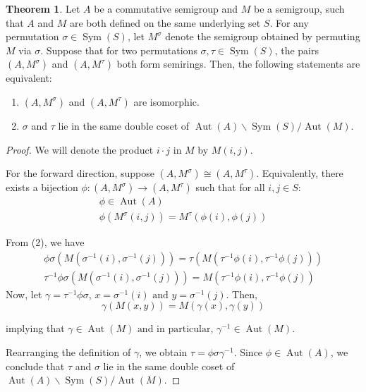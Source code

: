 \documentclass{article}
\theoremstyle{definition}
\newtheorem{theorem}{Theorem}
\begin{document}
\begin{theorem}
    \label{thm:isomorphism-condition}
    Let \(A\) be a commutative semigroup and \(M\) be a semigroup, such that \(A\) and \(M\) are both defined on the same underlying set \(S\). For any permutation \(\sigma \in \operatorname{Sym}(S)\), let \(M^\sigma\) denote the semigroup obtained by permuting \(M\) via \(\sigma\). Suppose that for two permutations \(\sigma, \tau\in\operatorname{Sym}(S)\), the pairs \((A,M^\sigma)\) and \((A,M^\tau)\) both form semirings. Then, the following statements are equivalent:
    \begin{enumerate}
        \item \((A, M^\sigma)\) and \((A, M^\tau)\) are isomorphic.
        \item \(\sigma\) and \(\tau\) lie in the same double coset of \(\operatorname{Aut}(A) \backslash \operatorname{Sym}(S) / \operatorname{Aut}(M)\).
    \end{enumerate}
\begin{proof}
    We will denote the product \(i\cdot j\) in \(M\) by \(M(i,j)\).

    For the forward direction, suppose \((A, M^\sigma) \cong (A, M^\tau)\). Equivalently, there exists a bijection \(\phi: (A, M^\sigma) \to (A, M^\tau)\) such that for all \(i, j \in S\):
    \begin{gather}
         \phi \in \operatorname{Aut}(A)\\
         \phi(M^\sigma(i,j)) = M^\tau(\phi(i),\phi(j))
    \end{gather}

    From (2), we have
    \begin{gather*}
        \phi\sigma(M(\sigma^{-1}(i), \sigma^{-1}(j))) = \tau(M(\tau^{-1}\phi(i), \tau^{-1}\phi(j))) \\
        \tau^{-1}\phi\sigma(M(\sigma^{-1}(i), \sigma^{-1}(j))) = M(\tau^{-1}\phi(i), \tau^{-1}\phi(j))
    \end{gather*}
    Now, let \(\gamma = \tau^{-1}\phi\sigma\), \(x = \sigma^{-1}(i)\text{ and }y=\sigma^{-1}(j)\). Then,
    \[
        \gamma(M(x, y)) = M(\gamma(x), \gamma(y))
    \]

    implying that \(\gamma \in \operatorname{Aut}(M) \text{ and in particular, } \gamma^{-1} \in \operatorname{Aut}(M)\). 
    
    Rearranging the definition of \(\gamma\), we obtain \(\tau = \phi\sigma\gamma^{-1}\). Since \(\phi \in \operatorname{Aut}(A)\), we conclude that \(\tau\) and \(\sigma\) lie in the same double coset of \(\operatorname{Aut}(A) \backslash \operatorname{Sym}(S) / \operatorname{Aut}(M)\).


\end{proof}
\end{theorem}
\end{document}
